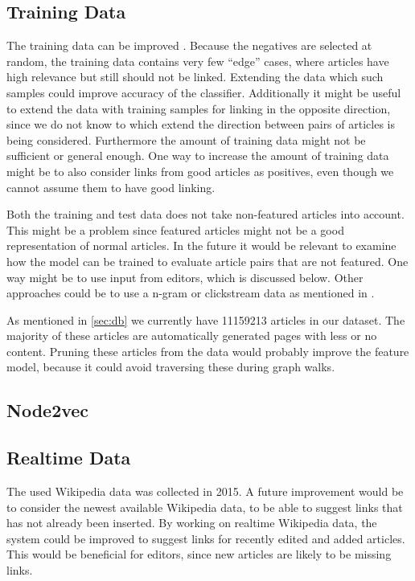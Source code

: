 \subsection{Training Data}
The training data can be improved . Because the negatives are selected at random, the training data contains very few \enquote{edge} cases, where articles have high relevance but still should not be linked. Extending the data which such samples could improve accuracy of the classifier. Additionally it might be useful to extend the data with training samples for linking in the opposite direction, since we do not know to which extend the direction between pairs of articles is being considered.
Furthermore the amount of training data might not be sufficient or general enough. One way to increase the amount of training data might be to also consider links from good articles as positives, even though we cannot assume them to have good linking.

Both the training and test data does not take non-featured articles into account. This might be a problem since featured articles might not be a good representation of normal articles. In the future it would be relevant to examine how the model can be trained to evaluate article pairs that are not featured. One way might be to use input from editors, which is discussed below. Other approaches could be to use a n-gram or clickstream data as mentioned in .

As mentioned in \cref{sec:db} we currently have \num{11159213} articles in our dataset. The majority of these articles are automatically generated pages with less or no content. Pruning these articles from the data would probably improve the feature model, because it could avoid traversing these during graph walks.

\subsection{Node2vec}

\subsection{Realtime Data}
The used Wikipedia data was collected in 2015. A future improvement would be to consider the newest available Wikipedia data, to be able to suggest links that has not already been inserted.
By working on realtime Wikipedia data, the system could be improved to suggest links for recently edited and added articles. This would be beneficial for editors, since new articles are likely to be missing links.

